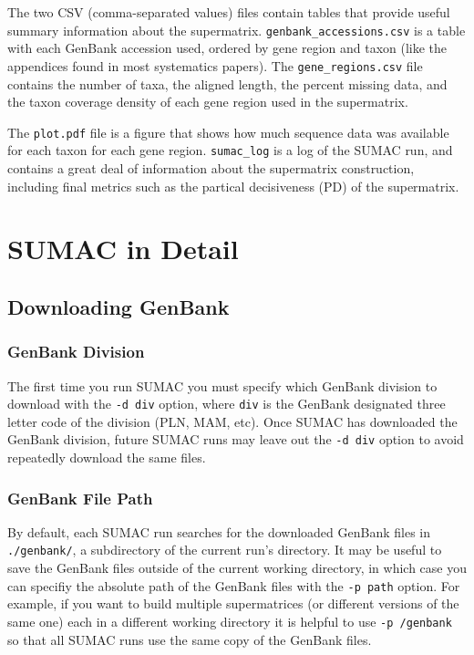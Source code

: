 \documentclass[10pt]{report}
\begin{document}
The two CSV (comma-separated values) files contain tables that provide useful
summary information about the supermatrix. \verb|genbank_accessions.csv| is a table
with each GenBank accession used, ordered by gene region and taxon (like the
appendices found in most systematics papers). The \verb|gene_regions.csv|
file contains the number of taxa, the aligned length, the percent missing data,
and the taxon coverage density of each gene region used in the supermatrix.

The \verb|plot.pdf| file is a figure that shows how much sequence data was available for
each taxon for each gene region.
\verb|sumac_log| is a log of the SUMAC run, and contains a great deal of information
about the supermatrix construction, including final metrics such as the partical
decisiveness (PD) of the supermatrix.
\fi


\chapter{SUMAC in Detail}

\section{Downloading GenBank}

\subsection{GenBank Division}

The first time you run SUMAC you must specify which GenBank division
to download with the \verb|-d div| option, where \verb|div| is the
GenBank designated three letter code of the division (PLN, MAM, etc).
Once SUMAC has downloaded the GenBank division, future SUMAC runs
may leave out the \verb|-d div| option to avoid repeatedly
download the same files.

\subsection{GenBank File Path}

By default, each SUMAC run searches for the downloaded GenBank files
in \verb|./genbank/|, a subdirectory of the current run's directory.
It may be useful to save the GenBank files outside of the current working
directory, in which case 
you can specifiy the absolute path of the GenBank files with the \verb|-p path| option.
For example, if you want to build
multiple supermatrices (or different versions of the same one) each in a different working directory
it is helpful
to use \verb|-p /genbank| so that all SUMAC runs use the same copy of the GenBank files.
\end{document}
